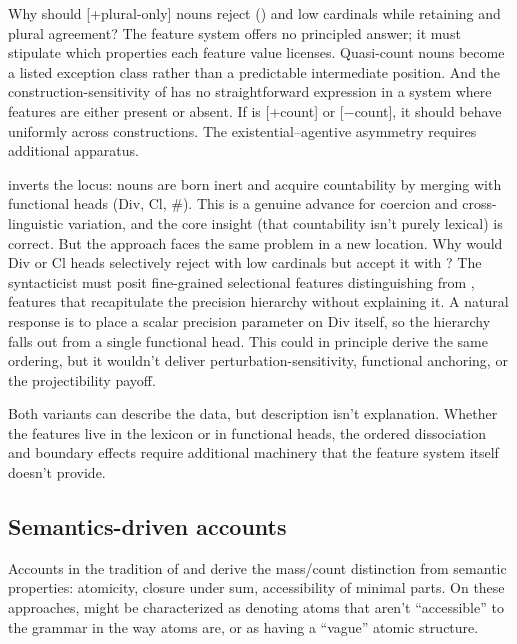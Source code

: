\documentclass[12pt,a4paper]{article}
\begin{document}
Why should [+plural-only] nouns reject () and low cardinals while retaining  and plural agreement? The feature system offers no principled answer; it must stipulate which properties each feature value licenses. Quasi-count nouns become a listed exception class rather than a predictable intermediate position. And the construction-sensitivity of  has no straightforward expression in a system where features are either present or absent. If  is [+count] or [−count], it should behave uniformly across constructions. The existential--agentive asymmetry requires additional apparatus.

\textcite{borer2005} inverts the locus: nouns are born inert and acquire countability by merging with functional heads (Div, Cl, \#). This is a genuine advance for coercion and cross-linguistic variation, and the core insight (that countability isn't purely lexical) is correct. But the approach faces the same problem in a new location. Why would Div or Cl heads selectively reject  with low cardinals but accept it with ? The syntacticist must posit fine-grained selectional features distinguishing  from , features that recapitulate the precision hierarchy without explaining it. A natural response is to place a scalar precision parameter on Div itself, so the hierarchy falls out from a single functional head. This could in principle derive the same ordering, but it wouldn't deliver perturbation-sensitivity, functional anchoring, or the projectibility payoff.

Both variants can describe the data, but description isn't explanation. Whether the features live in the lexicon or in functional heads, the ordered dissociation and boundary effects require additional machinery that the feature system itself doesn't provide.

\subsection{Semantics-driven accounts}

Accounts in the tradition of \textcite{chierchia1998} and \textcite{rothstein2010} derive the mass/count distinction from semantic properties: atomicity, closure under sum, accessibility of minimal parts. On these approaches,  might be characterized as denoting atoms that aren't \enquote{accessible} to the grammar in the way  atoms are, or as having a \enquote{vague} atomic structure.
\end{document}
